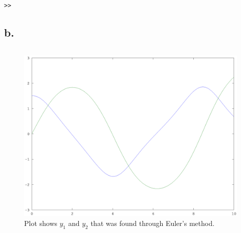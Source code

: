 \documentclass[00-main.tex]{subfiles}
\begin{document}
\begin{verbatim}
>> 
\end{verbatim}

\subsection*{b.}



\inputminted[linenos]{matlab}{newton_c.m}

\begin{figure}
\includegraphics[width=\textwidth]{euler_plot}
\caption{Plot shows $y_1$ and $y_2$ that was found through Euler's method.}
\end{figure}


\end{document}
